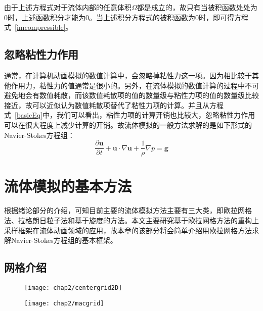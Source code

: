 由于上述方程式对于流体内部的任意体积\(\Omega\)都是成立的，故只有当被积函数处处为0时，上述函数积分才能为0。当上述积分方程式的被积函数为0时，即可得方程式~\ref{imcompressible}。

\subsection{忽略粘性力作用}

通常，在计算机动画模拟的数值计算中，会忽略掉粘性力这一项。因为相比较于其他作用力，粘性力的值通常是很小的。另外，在流体模拟的数值计算的过程中不可避免地会有数值耗散，而该数值耗散项的值的数量级与粘性力项的值的数量级比较接近，故可以近似认为数值耗散项替代了粘性力项的计算。并且从方程式~\ref{basicEq}中，我们可以看出，粘性力项的计算开销也比较大，忽略粘性力作用可以在很大程度上减少计算的开销。故流体模拟的一般方法求解的是如下形式的Navier-Stokes方程组：
\begin{equation}
\label{basicEqignoreVis}
 \frac{\partial \boldsymbol u}{\partial t} + {\boldsymbol u} \cdot \nabla {\boldsymbol u} + \frac{1}{\rho} \nabla p= {\boldsymbol g}
\end{equation}

\section{流体模拟的基本方法}

根据绪论部分的介绍，可知目前主要的流体模拟方法主要有三大类，即欧拉网格法、拉格朗日粒子法和基于旋度的方法。本文主要研究基于欧拉网格方法的重构上采样框架在流体动画领域的应用，故本章的该部分将会简单介绍用欧拉网格方法求解Navier-Stokes方程组的基本框架。

\subsection{网格介绍}

\begin{figure}
  \centering
   \texttt{[image: chap2/centergrid2D]}
\end{figure}

\begin{figure}[ht]
  \centering
   \texttt{[image: chap2/macgrid]}
\end{figure}

